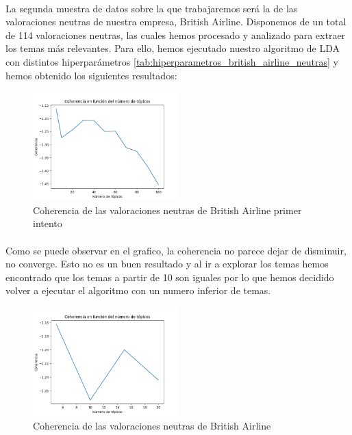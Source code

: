 \documentclass{report}
\begin{document}
{{                    \paragraph*{}{
                        La segunda muestra de datos sobre la que trabajaremos será la de las valoraciones neutras de nuestra empresa, British Airline.
                        Disponemos de un total de 114 valoraciones neutras, las cuales hemos procesado y analizado para extraer los temas más relevantes.
                        Para ello, hemos ejecutado nuestro algoritmo de LDA con distintos hiperparámetros \ref{tab:hiperparametros_british_airline_neutras} y hemos obtenido los siguientes resultados:
                    }
                    \begin{figure}[H]
                        \centering
                        \includegraphics[width=0.5\textwidth]{./img/british_airline_neutras1.png}
                        \caption{Coherencia de las valoraciones neutras de British Airline primer intento}
                    \end{figure}
                    \paragraph*{}{
                        Como se puede observar en el grafico, la coherencia no parece dejar de disminuir, no converge.
                        Esto no es un buen resultado y al ir a explorar los temas hemos encontrado que los temas a partir de 10 son iguales por lo que hemos decidido volver a ejecutar el algoritmo con un numero inferior de temas.
                    }
                    \begin{figure}[H]
                        \centering
                        \includegraphics[width=0.5\textwidth]{./img/british_airline_neutras2.png}
                        \caption{Coherencia de las valoraciones neutras de British Airline}
                    \end{figure}
}}
\end{document}
